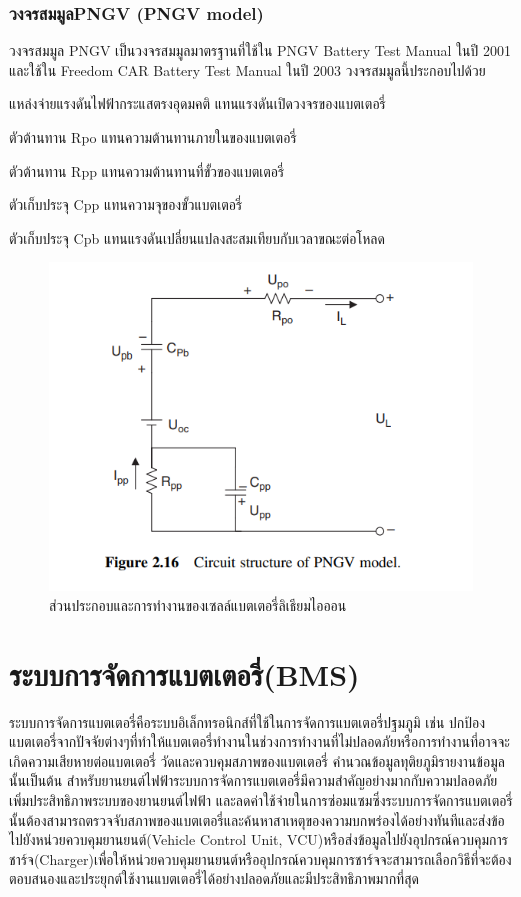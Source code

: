 \subsubsection*{วงจรสมมูลPNGV (PNGV model)}
วงจรสมมูล PNGV เป็นวงจรสมมูลมาตรฐานที่ใช้ใน PNGV Battery Test Manual ในปี 2001 และใช้ใน Freedom CAR Battery Test Manual
 ในปี 2003 วงจรสมมูลนี้ประกอบไปด้วย
\begin{itemize}
	{\item 	แหล่งจ่ายแรงดันไฟฟ้ากระแสตรงอุดมคติ แทนแรงดันเปิดวงจรของแบตเตอรี่}
	{\item 	ตัวต้านทาน Rpo แทนความต้านทานภายในของแบตเตอรี่}
	{\item 	ตัวต้านทาน Rpp แทนความต้านทานที่ขั้วของแบตเตอรี่}
	{\item 	ตัวเก็บประจุ Cpp แทนความจุของขั้วแบตเตอรี่}
	{\item 	ตัวเก็บประจุ Cpb แทนแรงดันเปลี่ยนแปลงสะสมเทียบกับเวลาขณะต่อโหลด}
\end{itemize}
\begin{center}
	\begin{figure}[!h]
		\includegraphics[width=0.6\linewidth]{Chapters/img/PNGV_model.png}
			\centering
			\captionsetup{justification=centering,margin=2cm}
			\caption{ส่วนประกอบและการทำงานของเซลล์แบตเตอรี่ลิเธียมไอออน}
	\end{figure}
\end{center}
\section{ระบบการจัดการแบตเตอรี่(BMS)}
ระบบการจัดการแบตเตอรี่คือระบบอิเล็กทรอนิกส์ที่ใช้ในการจัดการแบตเตอรี่ปฐมภูมิ เช่น ปกป้องแบตเตอรี่จากปัจจัยต่างๆที่ทำให้แบตเตอรี่ทำงานในช่วงการทำงานที่ไม่ปลอดภัยหรือการทำงานที่อาจจะเกิดความเสียหายต่อแบตเตอรี่ 
วัดและควบคุมสภาพของแบตเตอรี่ คำนวณข้อมูลทุติยภูมิรายงานข้อมูลนั้นเป็นต้น
สำหรับยานยนต์ไฟฟ้าระบบการจัดการแบตเตอรี่มีความสำคัญอย่างมากกับความปลอดภัย เพิ่มประสิทธิภาพระบบของยานยนต์ไฟฟ้า และลดค่าใช้จ่ายในการซ่อมแซมซึ่งระบบการจัดการแบตเตอรี่นั้นต้องสามารถตรวจจับสภาพของแบตเตอรี่และค้นหาสาเหตุของความบกพร่องได้อย่างทันทีและส่งข้อไปยังหน่วยควบคุมยานยนต์(Vehicle Control Unit, VCU)หรือส่งข้อมูลไปยังอุปกรณ์ควบคุมการชาร์จ(Charger)เพื่อให้หน่วยควบคุมยานยนต์หรืออุปกรณ์ควบคุมการชาร์จจะสามารถเลือกวิธีที่จะต้องตอบสนองและประยุกต์ใช้งานแบตเตอรี่ได้อย่างปลอดภัยและมีประสิทธิภาพมากที่สุด\newline
